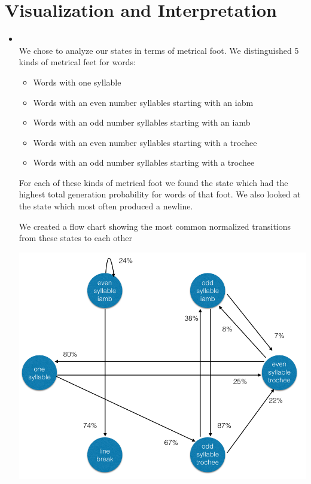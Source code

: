 \begin{itemize}
\end{itemize}



\section{Visualization and Interpretation}
\medskip
\begin{itemize}


    \item {} \\

    We chose to analyze our states in terms of metrical foot. We distinguished 5 kinds of metrical feet for words:

    \begin{itemize}

    \item Words with one syllable

    \item Words with an even number syllables starting with an iabm

    \item Words with an odd number syllables starting with an iamb

    \item Words with an even number syllables starting with a trochee

    \item Words with an odd number syllables starting with a trochee
    \end{itemize}

    For each of these kinds of metrical foot we found the state which had the highest total generation probability for words of that foot. We also looked at the state which most often produced a newline.

    We created a flow chart showing the most common normalized transitions from these states to each other

    \includegraphics[scale=0.5]{transitions.png}


\end{itemize}
